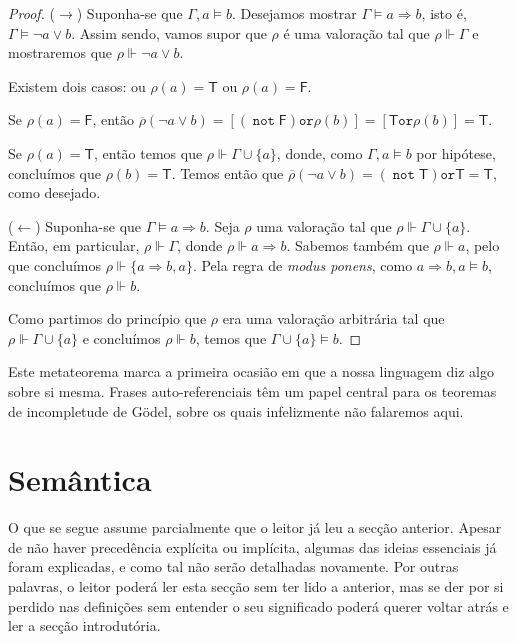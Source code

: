 \documentclass{report}
\theoremstyle{definition}
\theoremstyle{remark}
\newcommand{\lt}{\mathsf{T}}
\newcommand{\lf}{\mathsf{F}}
\DeclareMathOperator{\pnot}{\texttt{not}}
\newcommand{\por}{\mathbin{\texttt{or}}}
\newcommand{\imply}{\mathbin{\Rightarrow}}
\begin{document}
	\begin{proof}\label{dem:mtd}
	($\rightarrow$) Suponha-se que $\Gamma, a \vDash b$. Desejamos mostrar $\Gamma \vDash a \imply b$, isto é, $\Gamma \vDash \neg a \lor b$. Assim sendo, vamos supor que $\rho$ é uma valoração tal que $\rho \Vdash \Gamma$ e mostraremos que $\rho \Vdash \neg a \lor b$.
	
	Existem dois casos: ou $\rho(a) = \lt$ ou $\rho(a) = \lf$.
	
	Se $\rho(a) = \lf$, então $\overline\rho(\neg a \lor b) = [(\pnot \lf) \por \rho(b)] = [\lt \por \rho(b)] = \lt$.
	
	Se $\rho(a) = \lt$, então temos que $\rho \Vdash \Gamma \cup \{a\}$, donde, como $\Gamma, a \vDash b$ por hipótese, concluímos que $\rho(b) = \lt$. Temos então que $\overline\rho(\neg a \lor b) = (\pnot \lt) \por \lt = \lt$, como desejado.
	
	($\leftarrow$) Suponha-se que $\Gamma \vDash a \imply b$. Seja $\rho$ uma valoração tal que $\rho \Vdash \Gamma \cup \{a\}$. Então, em particular, $\rho \Vdash \Gamma$, donde $\rho \Vdash a \imply b$. Sabemos também que $\rho \Vdash a$, pelo que concluímos $\rho \Vdash \{a \imply b, a\}$. Pela regra de \textit{modus ponens}, como $a \imply b, a \vDash b$, concluímos que $\rho \Vdash b$.
	
	Como partimos do princípio que $\rho$ era uma valoração arbitrária tal que $\rho \Vdash \Gamma \cup \{a\}$ e concluímos $\rho \Vdash b$, temos que $\Gamma \cup \{a\} \vDash b$.
	\end{proof}
	
	Este metateorema marca a primeira ocasião em que a nossa linguagem diz algo sobre si mesma. Frases auto-referenciais têm um papel central para os teoremas de incompletude de Gödel, sobre os quais infelizmente não falaremos aqui.
	
	\section{Semântica}
	
	O que se segue assume parcialmente que o leitor já leu a secção anterior. Apesar de não haver precedência explícita ou implícita, algumas das ideias essenciais já foram explicadas, e como tal não serão detalhadas novamente. Por outras palavras, o leitor poderá ler esta secção sem ter lido a anterior, mas se der por si perdido nas definições sem entender o seu significado poderá querer voltar atrás e ler a secção introdutória.
	
	\medskip
	
\end{document}
